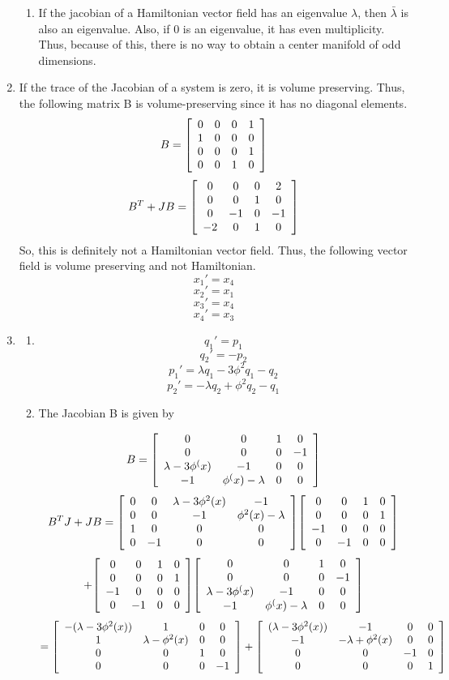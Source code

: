 \documentclass[a4paper,11pt]{article}
\newenvironment{mat}{\left[ \begin{array}{ccccccccccccc}}{\end{array}\right]}
\newcommand\bcm{\begin{mat}}
\newcommand\ecm{\end{mat}}
\begin{document}
\begin{enumerate}
\begin{enumerate}
		\item
		If the jacobian of a Hamiltonian vector field has an eigenvalue $\lambda$, then $\bar{\lambda}$ is also an eigenvalue. Also, if 0 is an eigenvalue, it has even multiplicity. Thus, because of this, there is no way to obtain a center manifold of odd dimensions.
		


	\end{enumerate}	
	
	\item 
	
	If the trace of the Jacobian of a system is zero, it is volume preserving.
	Thus, the following matrix B is volume-preserving since it has no diagonal elements.
	\[B  = \bcm  0 &0 &0 &1\\ 1 &0 &0 &0\\ 0 &0 &0&1\\ 0 &0 &1 &0 \ecm\]
	\[B^T + JB = \bcm  0 &0 &0 &2\\ 0 &0 &1 &0\\ 0 &-1 &0&-1\\ -2 &0 &1 &0 \ecm \]
	So, this is definitely not a Hamiltonian vector field.
	Thus, the following vector field is volume preserving and not Hamiltonian.
	\[x_1' = x_4\]
	\[x_2' = x_1\]
	\[x_3' = x_4\]
	\[x_4' = x_3\]
	\item
	\begin{enumerate}
		\item
		\[q_1' = p_1\]
		\[ q_2' = - p_2\]
		\[ p_1' = \lambda q_1 - 3\phi^2 q_1 - q_2\]
		\[ p_2' = -\lambda q_2 + \phi^2 q_2 - q_1\]
	
		\item
		The Jacobian B is given by

		
		\[B = \bcm 0 &0 &1 &0\\ 0 &0 &0 &-1\\ \lambda -3\phi^(x)&-1 &0 &0\\ -1 &\phi^(x)-\lambda &0 &0 \ecm\]
		\[B^TJ+JB= \bcm 0 &0 &\lambda-3\phi^2(x) &-1\\0 &0 &-1 &\phi^2(x)-\lambda\\1 &0 &0 &0\\ 0 &-1 &0 &0\ecm \bcm 0 &0 &1 &0\\0 &0 &0 &1\\ -1 &0 &0 &0\\ 0 &-1 &0 &0 \ecm  \]
		\[+  \bcm 0 &0 &1 &0\\0 &0 &0 &1\\ -1 &0 &0 &0\\ 0 &-1 &0 &0 \ecm \bcm 0 &0 &1 &0\\ 0 &0 &0 &-1\\ \lambda -3\phi^(x)&-1 &0 &0\\ -1 &\phi^(x)-\lambda &0 &0 \ecm\]
		\[= \bcm -(\lambda-3\phi^2(x)) &1 &0 &0\\1 &\lambda -\phi^2(x) &0 &0\\ 0 &0 &1 &0\\ 0 &0 &0 &-1 \ecm +\bcm (\lambda-3\phi^2(x)) &-1 &0 &0\\-1 &-\lambda +\phi^2(x) &0 &0\\ 0 &0 &-1 &0\\ 0 &0 &0 &1 \ecm\]
		

\end{enumerate}
\end{enumerate}
\end{document}
